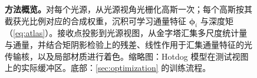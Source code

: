\begin{figure}[t]
  \centering
  \resizebox{0.94\textwidth}{!}{}
  \caption{\textbf{方法概览。}对每个光源，从光源视角光栅化高斯一次；每个高斯按其截获光比例对应的合成权重，沉积可学习通量特征 $\boldsymbol\phi_i$ 与深度矩（\cref{eq:atlas}）。接收点投影到光源视图，从金字塔汇集多尺度统计量与通量，并结合矩阴影检验上的残差、线性作用于汇集通量特征的光传输核，以及局部材质进行着色。缩略图：Hotdog 模型在测试视图上的实际缓冲区。底部：\cref{sec:optimization} 的训练流程。}
  \label{fig:pipeline}
\end{figure}

